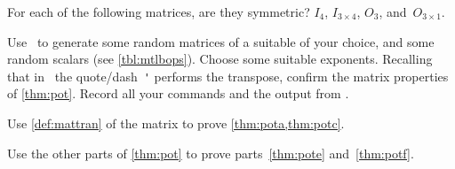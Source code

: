 \begin{exercise}  
For each of the following matrices, are they symmetric? 
\(I_4\), \(I_{3\times4}\), \(O_3\), and~\(O_{3\times1}\).
\end{exercise}




\begin{exercise}  
Use \script\ to generate some random matrices of a suitable  of your choice, and some random scalars (see \cref{tbl:mtlbops}).
Choose some suitable exponents.
Recalling that in \script\ the quote\slash dash~\verb|'| performs the transpose, confirm the matrix  properties of \cref{thm:pot}.
Record all your commands and the output from \script.
\end{exercise}


\begin{exercise}  
Use \cref{def:mattran} of the matrix  to prove \cref{thm:pota,thm:potc}.
\end{exercise}

\begin{exercise}  
Use the other parts of \cref{thm:pot} to prove parts~\ref{thm:pote} and~\ref{thm:potf}.
\end{exercise}



